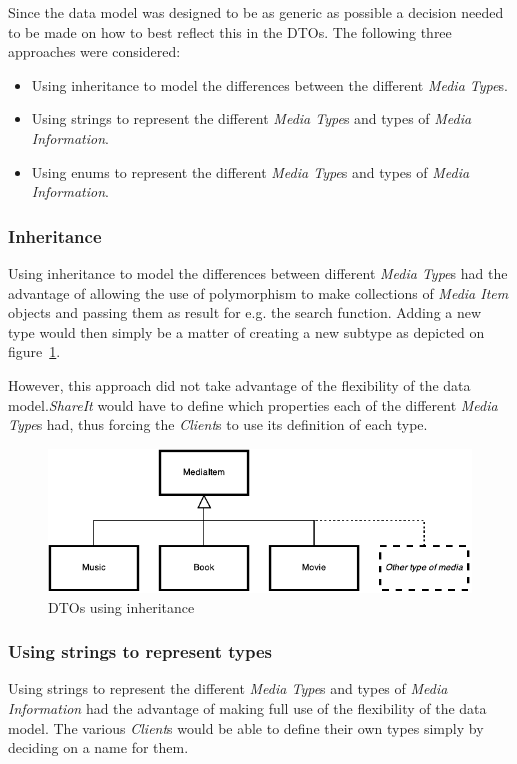 \documentclass[../report.tex]{subfiles}
\begin{document}
\graphicspath{{img/}{../img/}}
\label{sec:enums}

Since the data model was designed to be as generic as possible a decision needed to be made on how to best reflect this in the DTOs.
The following three approaches were considered:
\begin{itemize}
\item Using inheritance to model the differences between the different \textit{Media Type}s.
\item Using strings to represent the different \textit{Media Type}s and types of \textit{Media Information}.
\item Using enums to represent the different \textit{Media Type}s and types of \textit{Media Information}.
\end{itemize}

\subsubsection{Inheritance}
Using inheritance to model the differences between different \textit{Media Type}s had the advantage of allowing the use of polymorphism to make collections of \textit{Media Item} objects and passing them as result for e.g. the search function. Adding a new type would then simply be a matter of creating a new subtype as depicted on figure~\ref{fig:dto_inheritance}.
 
However, this approach did not take advantage of the flexibility of the data model.\textit{ShareIt} would have to define which properties each of the different \textit{Media Type}s had, thus forcing the \textit{Client}s to use its definition of each type.

\begin{figure}[!h]
\centering
\includegraphics[scale=0.9]{DTOInheritance.pdf}
\caption{DTOs using inheritance}
\label{fig:dto_inheritance}
\end{figure}

\subsubsection{Using strings to represent types}
Using strings to represent the different \textit{Media Type}s and  types of \textit{Media Information} had the advantage of making full use of the flexibility of the data model. The various \textit{Client}s would be able to define their own types simply by deciding on a name for them. 
\end{document}
